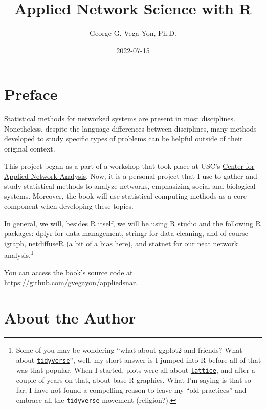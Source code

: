 \documentclass[]{book}
\title{Applied Network Science with R}
\author{George G. Vega Yon, Ph.D.}
\date{2022-07-15}
\begin{document}
\maketitle

{
\setcounter{tocdepth}{1}
\tableofcontents
}
\hypertarget{preface}{%
\chapter{Preface}\label{preface}}

\renewcommand{\Pr}[1]{\mbox{Pr}\left(#1\right)}
\renewcommand{\exp}[1]{\mbox{exp}\left\{#1\right\}}

Statistical methods for networked systems are present in most disciplines.
Nonetheless, despite the language differences between disciplines, many methods
developed to study specific types of problems can be helpful outside of their original context.

This project began as a part of a workshop that took place at USC's
\href{https://cana.usc.edu}{Center for Applied Network Analysis}. Now, it is a personal
project that I use to gather and study statistical methods to analyze networks, emphasizing social and biological systems.
Moreover, the book will use statistical computing methods as a core component
when developing these topics.

In general, we will, besides R itself, we will be using R studio and the following
R packages: dplyr for data management, stringr for data cleaning, and of course
igraph, netdiffuseR (a bit of a bias here), and statnet for our neat network
analysis.\footnote{Some of you may be wondering ``what about ggplot2 and friends? What about \href{https://www.tidyverse.org/}{\texttt{tidyverse}}'', well, my short answer is I jumped into R before all of that was that popular. When I started, plots were all about \href{https://CRAN.R-project.org/package=lattice}{\texttt{lattice}}, and after a couple of years on that, about base R graphics. What I'm saying is that so far, I have not found a compelling reason to leave my ``old practices'' and embrace all the \texttt{tidyverse} movement (religion?).}

You can access the book's source code at \url{https://github.com/gvegayon/appliedsnar}.

\hypertarget{about-the-author}{%
\chapter{About the Author}\label{about-the-author}}
\end{document}
